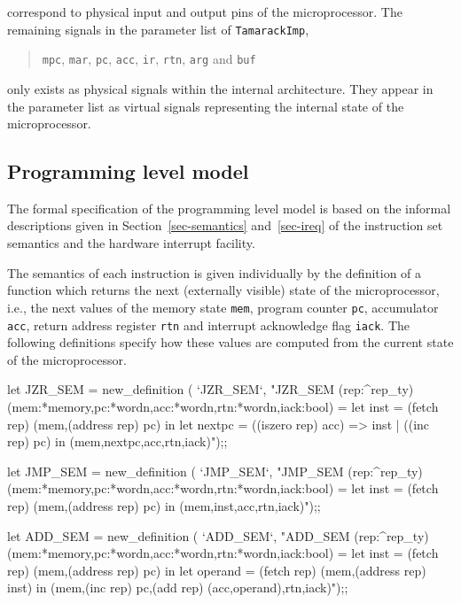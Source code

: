 \noindent
correspond to physical input and output pins of the microprocessor.
The remaining signals in the parameter list of \verb"TamarackImp",

\begin{quote}
\verb"mpc", \verb"mar", \verb"pc", \verb"acc", \verb"ir", \verb"rtn",
\verb"arg" and \verb"buf"
\end{quote}

\noindent
only exists as physical signals within the internal architecture.
They appear in the parameter list as
virtual signals representing
the internal state of the microprocessor.

\subsection{Programming level model}
\label{sec-formsem}

The formal specification of the programming level model is
based on the informal descriptions given
in Section~\ref{sec-semantics} and~\ref{sec-ireq}
of the instruction set semantics and the hardware interrupt facility.

The semantics of each instruction is given individually by the
definition of a function which returns
the next (externally visible) state of the microprocessor,
i.e., the next values of the memory state \verb"mem",
program counter \verb"pc",
accumulator \verb"acc",
return address register \verb"rtn"
and interrupt acknowledge flag \verb"iack".
The following definitions specify how these values are computed
from the current state of the microprocessor.

\begintt
let JZR_SEM = new_definition (
  `JZR_SEM`,
  "JZR_SEM (rep:^rep_ty)
    (mem:*memory,pc:*wordn,acc:*wordn,rtn:*wordn,iack:bool) =
    let inst = (fetch rep) (mem,(address rep) pc) in
    let nextpc = ((iszero rep) acc) => inst | ((inc rep) pc) in
      (mem,nextpc,acc,rtn,iack)");;

let JMP_SEM = new_definition (
  `JMP_SEM`,
  "JMP_SEM (rep:^rep_ty)
    (mem:*memory,pc:*wordn,acc:*wordn,rtn:*wordn,iack:bool) =
    let inst = (fetch rep) (mem,(address rep) pc) in
      (mem,inst,acc,rtn,iack)");;

let ADD_SEM = new_definition (
  `ADD_SEM`,
  "ADD_SEM (rep:^rep_ty)
    (mem:*memory,pc:*wordn,acc:*wordn,rtn:*wordn,iack:bool) =
    let inst = (fetch rep) (mem,(address rep) pc) in
    let operand = (fetch rep) (mem,(address rep) inst) in
      (mem,(inc rep) pc,(add rep) (acc,operand),rtn,iack)");;

